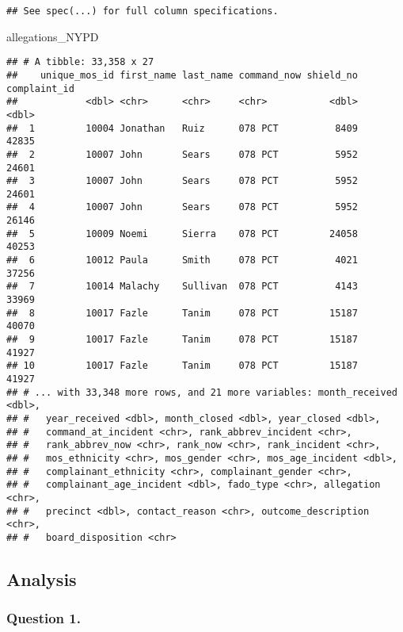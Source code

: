 \documentclass[
]{article}
\newenvironment{Shaded}{\begin{snugshade}}{\end{snugshade}}
\newcommand{\NormalTok}[1]{#1}
\begin{document}
\begin{verbatim}
## See spec(...) for full column specifications.
\end{verbatim}

\begin{Shaded}
\begin{Highlighting}[]
\NormalTok{allegations_NYPD}
\end{Highlighting}
\end{Shaded}

\begin{verbatim}
## # A tibble: 33,358 x 27
##    unique_mos_id first_name last_name command_now shield_no complaint_id
##            <dbl> <chr>      <chr>     <chr>           <dbl>        <dbl>
##  1         10004 Jonathan   Ruiz      078 PCT          8409        42835
##  2         10007 John       Sears     078 PCT          5952        24601
##  3         10007 John       Sears     078 PCT          5952        24601
##  4         10007 John       Sears     078 PCT          5952        26146
##  5         10009 Noemi      Sierra    078 PCT         24058        40253
##  6         10012 Paula      Smith     078 PCT          4021        37256
##  7         10014 Malachy    Sullivan  078 PCT          4143        33969
##  8         10017 Fazle      Tanim     078 PCT         15187        40070
##  9         10017 Fazle      Tanim     078 PCT         15187        41927
## 10         10017 Fazle      Tanim     078 PCT         15187        41927
## # ... with 33,348 more rows, and 21 more variables: month_received <dbl>,
## #   year_received <dbl>, month_closed <dbl>, year_closed <dbl>,
## #   command_at_incident <chr>, rank_abbrev_incident <chr>,
## #   rank_abbrev_now <chr>, rank_now <chr>, rank_incident <chr>,
## #   mos_ethnicity <chr>, mos_gender <chr>, mos_age_incident <dbl>,
## #   complainant_ethnicity <chr>, complainant_gender <chr>,
## #   complainant_age_incident <dbl>, fado_type <chr>, allegation <chr>,
## #   precinct <dbl>, contact_reason <chr>, outcome_description <chr>,
## #   board_disposition <chr>
\end{verbatim}

\hypertarget{analysis}{%
\subsection{Analysis}\label{analysis}}

\hypertarget{question-1.}{%
\subsubsection{Question 1.}\label{question-1.}}
\end{document}

